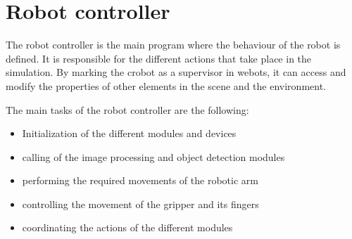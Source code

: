 





\section{Robot controller}

The robot controller is the main program where the behaviour of the robot is defined. It is responsible for the different actions that take place in the simulation. By marking the crobot as a supervisor in webots, it can access and modify the properties of other elements in the scene and the environment. 

The main tasks of the robot controller are the following:

\begin{itemize}
    \item Initialization of the different modules and devices
    \item calling of the image processing and object detection modules
    \item performing the required movements of the robotic arm
    \item controlling the movement of the gripper and its fingers
    \item coordinating the actions of the different modules
\end{itemize}

